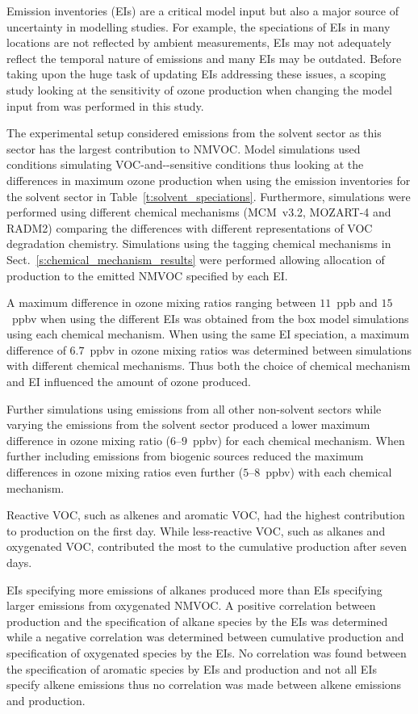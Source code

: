 Emission inventories (EIs) are a critical model input but also a major source of uncertainty in modelling studies.
For example, the speciations of EIs in many locations are not reflected by ambient measurements, EIs may not adequately reflect the temporal nature of emissions and many EIs may be outdated.
Before taking upon the huge task of updating EIs addressing these issues, a scoping study looking at the sensitivity of ozone production when changing the model input from was performed in this study.

The experimental setup considered emissions from the solvent sector as this sector has the largest contribution to NMVOC. 
Model simulations used  conditions simulating VOC-and--sensitive conditions thus looking at the differences in maximum ozone production when using the emission inventories for the solvent sector in Table~\ref{t:solvent_speciations}.
Furthermore, simulations were performed using different chemical mechanisms (MCM~v3.2, MOZART-4 and RADM2) comparing the differences with different representations of VOC degradation chemistry.
Simulations using the tagging chemical mechanisms in Sect.~\ref{s:chemical_mechanism_results} were performed allowing allocation of  production to the emitted NMVOC specified by each EI.

A maximum difference in ozone mixing ratios ranging between $11$~ppb and $15$~ppbv when using the different EIs was obtained from the box model simulations using each chemical mechanism.
When using the same EI speciation, a maximum difference of $6.7$~ppbv in ozone mixing ratios was determined between simulations with different chemical mechanisms.
Thus both the choice of chemical mechanism and EI influenced the amount of ozone produced.

Further simulations using emissions from all other non-solvent sectors while varying the emissions from the solvent sector produced a lower maximum difference in ozone mixing ratio ($6$--$9$~ppbv) for each chemical mechanism.
When further including emissions from biogenic sources reduced the maximum differences in ozone mixing ratios even further ($5$--$8$~ppbv) with each chemical mechanism.

Reactive VOC, such as alkenes and aromatic VOC, had the highest contribution to  production on the first day.
While less-reactive VOC, such as alkanes and oxygenated VOC, contributed the most to the cumulative  production after seven days.

EIs specifying more emissions of alkanes produced more  than EIs specifying larger emissions from oxygenated NMVOC.
A positive correlation between  production and the specification of alkane species by the EIs was determined while a negative correlation was determined between cumulative  production and specification of oxygenated species by the EIs.
No correlation was found between the specification of aromatic species by EIs and  production and not all EIs specify alkene emissions thus no correlation was made between alkene emissions and  production.

